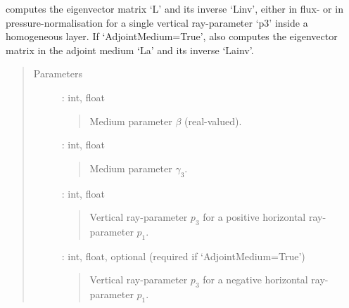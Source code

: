 \documentclass[letterpaper,10pt,english]{sphinxmanual}
\begin{document}
\begin{fulllineitems}
\begin{fulllineitems}
%
\begin{sphinxVerbatim}[commandchars=\\\{\}]
\PYG{p}{[}\PYG{p}{]}
\end{sphinxVerbatim}

\end{fulllineitems}


\begin{fulllineitems}
\label{\detokenize{Layered_NRM_p_w:Layered_NRM_p_w.Layered_NRM_p_w.L_eigenvectors_p_w}}
computes the eigenvector matrix ‘L’ and its inverse ‘Linv’, either in flux- or in pressure-normalisation for a single vertical ray-parameter ‘p3’ inside a homogeneous layer. If ‘AdjointMedium=True’,  also computes the eigenvector matrix in the adjoint medium ‘La’ and its inverse ‘Lainv’.
\begin{quote}\begin{description}
\item[{Parameters}] \leavevmode
{} : int, float
\begin{quote}

Medium parameter \(\beta\)  (real-valued).
\end{quote}

 : int, float
\begin{quote}

Medium parameter \(\gamma_3\).
\end{quote}

 : int, float
\begin{quote}

Vertical ray-parameter \(p_3\) for a positive horizontal ray-parameter \(p_1\).
\end{quote}

 : int, float, optional (required if ‘AdjointMedium=True’)
\begin{quote}

Vertical ray-parameter \(p_3\) for a negative horizontal ray-parameter \(p_1\).
\end{quote}


\end{description}
\end{quote}
\end{fulllineitems}
\end{fulllineitems}
\end{document}
